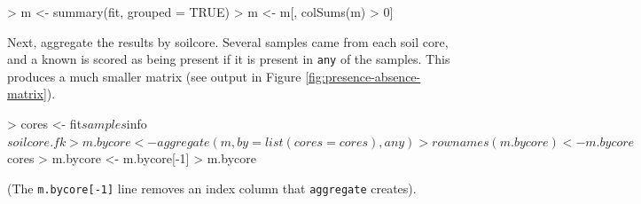 \documentclass[a4paper]{article}
\newcommand\code\texttt
\begin{document}
\begin{Schunk}
\begin{Sinput}
> m <- summary(fit, grouped = TRUE)
> m <- m[, colSums(m) > 0]
\end{Sinput}
\end{Schunk}

Next, aggregate the results by soilcore.  Several samples came from
each soil core, and a known is scored as being present if it is
present in \code{any} of the samples.  This produces a much smaller
matrix (see output in Figure \ref{fig:presence-absence-matrix}).

\begin{Schunk}
\begin{Sinput}
> cores <- fit$samples$info$soilcore.fk
> m.bycore <- aggregate(m, by = list(cores = cores), any)
> rownames(m.bycore) <- m.bycore$cores
> m.bycore <- m.bycore[-1]
> m.bycore
\end{Sinput}
\end{Schunk}

(The \code{m.bycore[-1]} line removes an index column that
\code{aggregate} creates).
\end{document}
